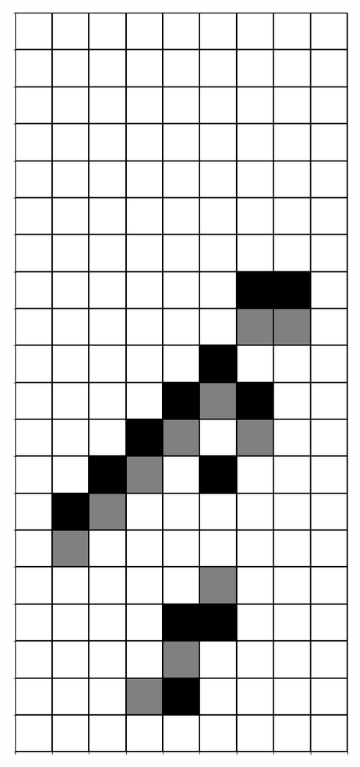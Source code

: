 \documentclass[12pt]{article}
\numberwithin{figure}{section} %
\begin{document}
\begin{figure}[H]
\begin{subfigure}{0.3\textwidth}
     \subcaption{}
   \end{subfigure}
        \begin{subfigure}{0.3\textwidth}
     \centering
     \includegraphics[angle=270,width=\linewidth]{Section4/22.2}

\end{subfigure}
\end{figure}
\end{document}
